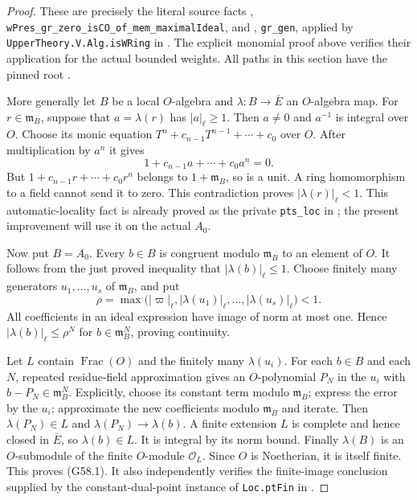 \begin{proof}
These are precisely the literal source facts
,
\texttt{wPres\_gr\_zero\_isCO\_of\_mem\_maximalIdeal},
and ,
\texttt{gr\_gen}, applied by
\texttt{UpperTheory.V.Alg.isWRing} in
.
The explicit monomial proof above verifies their
application for the actual bounded weights.
All paths in this section have the pinned root
.

More generally let $B$ be a local $O$-algebra and
$\lambda:B\to\overline E$ an $O$-algebra map.
For $r\in\mathfrak m_B$, suppose that
$a=\lambda(r)$ has $|a|_\ell\geq1$.
Then $a\ne0$ and $a^{-1}$ is integral over $O$.
Choose its monic equation
$T^n+c_{n-1}T^{n-1}+\cdots+c_0$ over $O$.
After multiplication by $a^n$ it gives
\[
             1+c_{n-1}a+\cdots+c_0a^n=0.
                                                               \tag{G58.2}
\]
But $1+c_{n-1}r+\cdots+c_0r^n$ belongs to
$1+\mathfrak m_B$, so is a unit.  A ring
homomorphism to a field cannot send it to zero.
This contradiction proves
$|\lambda(r)|_\ell<1$.
This automatic-locality fact is already proved
as the private \texttt{pts\_loc} in
;
the present improvement will use it on the
actual $A_0$.

Now put $B=A_0$.
Every $b\in B$ is congruent modulo
$\mathfrak m_B$ to an element of $O$.
It follows from the just proved inequality that
$|\lambda(b)|_\ell\leq1$.
Choose finitely many generators
$u_1,\ldots,u_s$ of $\mathfrak m_B$, and put
\[
        \rho=\max\bigl(|\varpi|_\ell,
                       |\lambda(u_1)|_\ell,\ldots,
                       |\lambda(u_s)|_\ell\bigr)<1 .
                                                               \tag{G58.3}
\]
All coefficients in an ideal expression have
image of norm at most one.
Hence
$|\lambda(b)|_\ell\leq\rho^N$ for
$b\in\mathfrak m_B^N$, proving continuity.

Let $L$ contain $\operatorname{Frac}(O)$ and
the finitely many $\lambda(u_i)$.
For each $b\in B$ and each $N$, repeated
residue-field approximation gives an
$O$-polynomial $P_N$ in the $u_i$ with
$b-P_N\in\mathfrak m_B^N$.
Explicitly, choose its constant term modulo
$\mathfrak m_B$; express the error by the
$u_i$; approximate the new coefficients
modulo $\mathfrak m_B$ and iterate.
Then $\lambda(P_N)\in L$ and
$\lambda(P_N)\to\lambda(b)$.
A finite extension $L$ is complete and hence
closed in $\overline E$, so
$\lambda(b)\in L$.
It is integral by its norm bound.
Finally $\lambda(B)$ is an $O$-submodule of
the finite $O$-module $\mathcal O_L$.
Since $O$ is Noetherian, it is itself finite.
This proves (G58.1).
It also independently verifies the finite-image
conclusion supplied by the constant-dual-point
instance of \texttt{Loc.ptFin} in
.
\end{proof}

